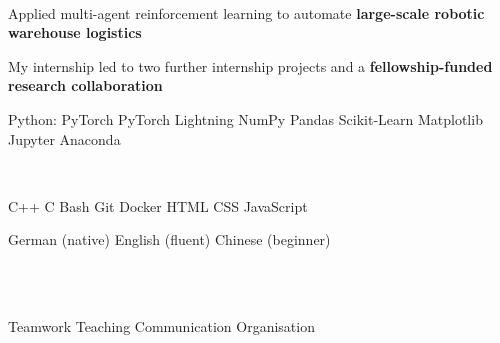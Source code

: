 \documentclass[]{lukas-cv-openfont}
\begin{document}
\noindent
{}
\\
\begin{tightitemize}{1.7em}
\item Applied multi-agent reinforcement learning to automate \textbf{large-scale robotic warehouse logistics} \cite{krnjaic2022scalable}
\item My internship led to two further internship projects and a \textbf{fellowship-funded research collaboration}
\end{tightitemize}
\largesectionsep


\newpage

\vspace{-0.7em}
\begin{multicols}{2}
    \raggedright
    \setlength{\columnsep}{1.5cm}
    \setlength{\columnseprule}{0.2pt}
    \noindent

    \begin{skillblock}
        Python: PyTorch \textbullet{} PyTorch Lightning \textbullet{} NumPy \textbullet{} Pandas \textbullet{} Scikit-Learn \textbullet{} Matplotlib \textbullet{} Jupyter \textbullet{} Anaconda
    \end{skillblock}

    \ \\

    \begin{skillblock}
        C++ \textbullet{} C \textbullet{} Bash \textbullet{} Git \textbullet{} Docker \textbullet{} HTML \textbullet{} CSS \textbullet{} JavaScript
    \end{skillblock}

    \raggedleft

    \begin{skillblock}
        German (native) \textbullet{} English (fluent) \textbullet{} Chinese (beginner)
    \end{skillblock}

    \ \\
    \ \\

    \begin{skillblock}
        Teamwork \textbullet{} Teaching \textbullet{} Communication \textbullet{} Organisation
    \end{skillblock}
\end{multicols}
\largesectionsep
\end{document}
